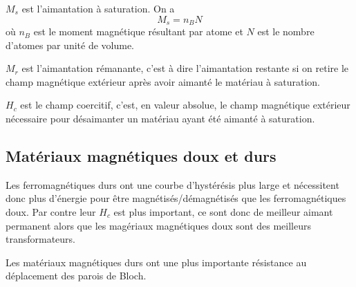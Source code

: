 $M_s$ est l'aimantation à saturation.
On a
\[ M_s = n_B N \]
où $n_B$ est le moment magnétique résultant par atome
et $N$ est le nombre d'atomes par unité de volume.

$M_r$ est l'aimantation rémanante,
c'est à dire l'aimantation restante si on retire le champ magnétique
extérieur après avoir aimanté le matériau à saturation.

$H_c$ est le champ coercitif, c'est, en valeur absolue,
le champ magnétique extérieur nécessaire pour désaimanter
un matériau ayant été aimanté à saturation.

\subsection{Matériaux magnétiques doux et durs}
Les ferromagnétiques durs ont une courbe d'hystérésis plus large et
nécessitent donc plus d'énergie pour
être magnétisés/démagnétisés que les ferromagnétiques doux.
Par contre leur $H_c$ est plus important,
ce sont donc de meilleur aimant permanent alors que
les magériaux magnétiques doux sont des meilleurs transformateurs.

Les matériaux magnétiques durs ont une plus importante
résistance au déplacement des parois de Bloch.

